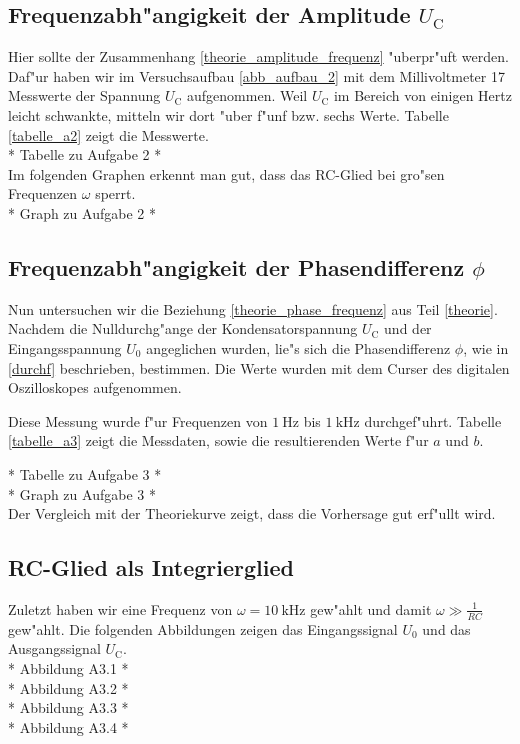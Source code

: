 \documentclass{scrartcl}
\begin{document}
		\subsection{Frequenzabh"angigkeit der Amplitude $U_{\mathrm{C}}$}

			Hier sollte der Zusammenhang \ref{theorie_amplitude_frequenz} "uberpr"uft werden.
			Daf"ur haben wir im Versuchsaufbau \ref{abb_aufbau_2} mit dem Millivoltmeter 17 Messwerte der Spannung $U_{\mathrm{C}}$ aufgenommen.
			Weil $U_{\mathrm{C}}$ im Bereich von einigen Hertz leicht schwankte,
			mitteln wir dort "uber f"unf bzw. sechs Werte.
			Tabelle \ref{tabelle_a2} zeigt die Messwerte.\\

			* Tabelle zu Aufgabe 2 * \\

			Im folgenden Graphen erkennt man gut, dass das RC-Glied bei gro"sen Frequenzen $\omega$ sperrt.\\

			* Graph zu Aufgabe 2 * \\


		\subsection{Frequenzabh"angigkeit der Phasendifferenz $\phi$}

			Nun untersuchen wir die Beziehung \ref{theorie_phase_frequenz} aus Teil \ref{theorie}.
			Nachdem die Nulldurchg"ange der Konden\-sator\-spannung $U_{\mathrm{C}}$ und der Eingangsspannung $U_0$ angeglichen wurden,
			lie"s sich die Phasendifferenz $\phi$, wie in \ref{durchf} beschrieben, bestimmen.
			Die Werte wurden mit dem Curser des digitalen Oszilloskopes aufgenommen.

			Diese Messung wurde f"ur Frequenzen von $\SI{1}{\hertz}$ bis $\SI{1}{\kilo\hertz}$ durchgef"uhrt. Tabelle \ref{tabelle_a3} zeigt die Messdaten, sowie die resultierenden Werte f"ur $a$ und $b$.

			* Tabelle zu Aufgabe 3 * \\

			* Graph zu Aufgabe 3 * \\

			Der Vergleich mit der Theoriekurve zeigt, dass die Vorhersage gut erf"ullt wird.

		\subsection{RC-Glied als Integrierglied}

			Zuletzt haben wir eine Frequenz von $\omega = \SI{10}{\kilo\hertz}$ gew"ahlt und damit $\omega \gg \frac{1}{RC}$ gew"ahlt.
			Die folgenden Abbildungen zeigen das Eingangssignal $U_0$ und das Ausgangssignal $U_{\mathrm{C}}$.\\

			* Abbildung A3.1 * \\

			* Abbildung A3.2 * \\

			* Abbildung A3.3 * \\

			* Abbildung A3.4 * \\
\end{document}
